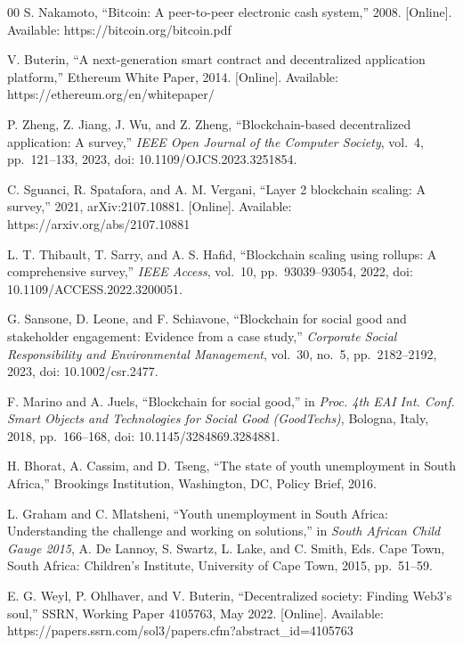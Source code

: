 \documentclass[conference]{IEEEtran}
\begin{document}
\begin{thebibliography}{00}
	 S. Nakamoto, ``Bitcoin: A peer-to-peer electronic cash system,'' 2008. [Online]. Available: https://bitcoin.org/bitcoin.pdf

	 V. Buterin, ``A next-generation smart contract and decentralized application platform,'' Ethereum White Paper, 2014. [Online]. Available: https://ethereum.org/en/whitepaper/

	 P. Zheng, Z. Jiang, J. Wu, and Z. Zheng, ``Blockchain-based decentralized application: A survey,'' \emph{IEEE Open Journal of the Computer Society}, vol.~4, pp.~121--133, 2023, doi: 10.1109/OJCS.2023.3251854.

	 C. Sguanci, R. Spatafora, and A. M. Vergani, ``Layer 2 blockchain scaling: A survey,'' 2021, arXiv:2107.10881. [Online]. Available: https://arxiv.org/abs/2107.10881

	 L. T. Thibault, T. Sarry, and A. S. Hafid, ``Blockchain scaling using rollups: A comprehensive survey,'' \emph{IEEE Access}, vol.~10, pp.~93039--93054, 2022, doi: 10.1109/ACCESS.2022.3200051.

	 G. Sansone, D. Leone, and F. Schiavone, ``Blockchain for social good and stakeholder engagement: Evidence from a case study,'' \emph{Corporate Social Responsibility and Environmental Management}, vol.~30, no.~5, pp.~2182--2192, 2023, doi: 10.1002/csr.2477.

	 F. Marino and A. Juels, ``Blockchain for social good,'' in \emph{Proc. 4th EAI Int. Conf. Smart Objects and Technologies for Social Good (GoodTechs)}, Bologna, Italy, 2018, pp.~166--168, doi: 10.1145/3284869.3284881.

	 H. Bhorat, A. Cassim, and D. Tseng, ``The state of youth unemployment in South Africa,'' Brookings Institution, Washington, DC, Policy Brief, 2016.

	 L. Graham and C. Mlatsheni, ``Youth unemployment in South Africa: Understanding the challenge and working on solutions,'' in \emph{South African Child Gauge 2015}, A. De Lannoy, S. Swartz, L. Lake, and C. Smith, Eds. Cape Town, South Africa: Children's Institute, University of Cape Town, 2015, pp.~51--59.

	 E. G. Weyl, P. Ohlhaver, and V. Buterin, ``Decentralized society: Finding Web3's soul,'' SSRN, Working Paper 4105763, May 2022. [Online]. Available: https://papers.ssrn.com/sol3/papers.cfm?abstract\_id=4105763


\end{thebibliography}
\end{document}
